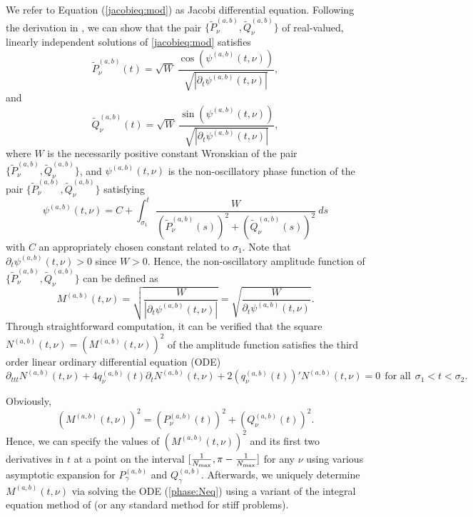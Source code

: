 \documentclass[11pt]{article}
\begin{document}
We refer to Equation (\ref{jacobieq:mod}) as Jacobi differential
equation. Following the derivation in \cite{Jacobi}, we can show that the pair $\{\tilde{P}_\nu^{(a,b)},\tilde{Q}_\nu^{(a,b)}\}$ of real-valued,  linearly independent solutions of \eqref{jacobieq:mod} satisfies 
\begin{equation}
\tilde{P}_\nu^{(a,b)}(t) = \sqrt{W}\ \frac{\cos\left(\psi^{(a,b)}(t,\nu)\right)}{\sqrt{\left|\partial_t \psi^{(a,b)}(t,\nu)\right|}},
\label{phase:u2}
\end{equation}
and
\begin{equation}
\tilde{Q}_\nu^{(a,b)}(t) = \sqrt{W}\ \frac{\sin\left(\psi^{(a,b)}(t,\nu)\right)}{\sqrt{\left|\partial_t \psi^{(a,b)}(t,\nu)\right|}},
\label{phase:v2}
\end{equation}
where $W$ is the necessarily positive constant Wronskian  of the pair $\{\tilde{P}_\nu^{(a,b)}, \tilde{Q}_\nu^{(a,b)}\}$, and $\psi^{(a,b)}(t,\nu)$ is the non-oscillatory phase function of the pair $\{\tilde{P}_\nu^{(a,b)}, \tilde{Q}_\nu^{(a,b)}\}$ satisfying
\begin{equation}
\psi^{(a,b)}(t,\nu) = C + \int_{\sigma_1}^t 
 \frac{W}{(\tilde{P}_\nu^{(a,b)}(s))^2+(\tilde{Q}_\nu^{(a,b)}(s))^2} \ ds
\end{equation}
with $C$ an appropriately chosen constant related to $\sigma_1$. Note that $\partial_t\psi^{(a,b)}(t,\nu)>0$ since $W>0$. Hence, the non-oscillatory amplitude function of $\{\tilde{P}_\nu^{(a,b)}, \tilde{Q}_\nu^{(a,b)}\}$ can be defined as
\begin{equation}
M^{(a,b)}(t,\nu) = \sqrt{\frac{W}{\left|\partial_t \psi^{(a,b)}(t,\nu)\right|}}=\sqrt{\frac{W}{\partial_t \psi^{(a,b)}(t,\nu)}}.
\label{phase:mpsip}
\end{equation}
Through straightforward computation, 
it can be verified that
the square  $N^{(a,b)}(t,\nu) = \left(M^{(a,b)}(t,\nu)\right)^2$ of the amplitude function
satisfies the third order linear ordinary differential equation (ODE) 
\begin{equation}
\partial_{ttt} N^{(a,b)}(t,\nu) + 4 q_\nu^{(a,b)}(t)  \partial_t N^{(a,b)}(t,\nu)  + 2 (q_\nu^{(a,b)}(t))' N^{(a,b)}(t,\nu) = 0
\ \ \mbox{for all}\ \ \sigma_1 < t < \sigma_2.
\label{phase:Neq}
\end{equation}



Obviously,
\begin{equation}
\left(M^{(a,b)}(t,\nu)\right)^2 = 
\left(P_\nu^{(a,b)}(t)\right)^2+\left(Q_\nu^{(a,b)}(t)\right)^2.
\label{jacobiphase:M}
\end{equation}
Hence, we can specify the values of $\left(M^{(a,b)}(t,\nu)\right)^2$ and its first two derivatives in $t$ 
at a point on the interval $[\frac{1}{N_{\mbox{\tiny max}}},\pi-\frac{1}{N_{\mbox{\tiny max}}}]$ for any $\nu$ using various asymptotic expansion for 
 $P_\gamma^{(a,b)}$ and $Q_\gamma^{(a,b)}$.
Afterwards, we uniquely determine $M^{(a,b)}(t,\nu)$ via solving the ODE (\ref{phase:Neq})
 using a variant of the integral equation method of \cite{Greengard} 
 (or any standard method for stiff problems).
\end{document}
